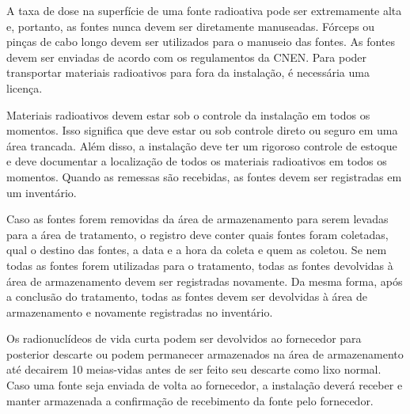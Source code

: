 \documentclass[11pt,a4paper]{article}
\begin{document}
	A taxa de dose na superfície de uma fonte radioativa pode ser extremamente alta e, portanto, as fontes nunca devem ser diretamente manuseadas. Fórceps ou pinças de cabo longo devem ser utilizados para o manuseio das fontes. As fontes devem ser enviadas de acordo com os regulamentos da CNEN. Para poder transportar materiais radioativos para fora da instalação, é necessária uma licença. 

	Materiais radioativos devem estar sob o controle da instalação em todos os momentos. Isso significa que deve estar ou sob controle direto ou seguro em uma área trancada. Além disso, a instalação deve ter um rigoroso controle de estoque e deve documentar a localização de todos os materiais radioativos em todos os momentos. Quando as remessas são recebidas, as fontes devem ser registradas em um inventário.
	
	Caso as fontes forem removidas da área de armazenamento para serem levadas para a área de tratamento, o registro deve conter quais fontes foram coletadas, qual o destino das fontes, a data e a hora da coleta e quem as coletou. Se nem todas as fontes forem utilizadas para o tratamento, todas as fontes devolvidas à área de armazenamento devem ser registradas novamente. Da mesma forma, após a conclusão do tratamento, todas as fontes devem ser devolvidas à área de armazenamento e novamente registradas no inventário.
	
	Os radionuclídeos de vida curta podem ser devolvidos ao fornecedor para posterior descarte ou podem permanecer armazenados na área de armazenamento até decairem 10 meias-vidas antes de ser feito seu descarte como lixo normal. Caso uma fonte seja enviada de volta ao fornecedor, a instalação deverá receber e manter armazenada a confirmação de recebimento da fonte pelo fornecedor.
	

\end{document}

